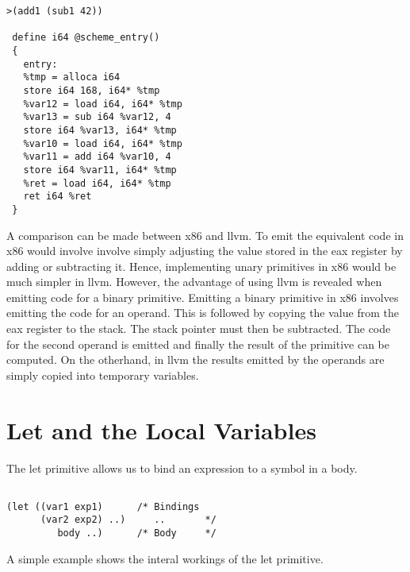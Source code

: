 \documentclass{article}
\begin{document}
\begin{verbatim}
>(add1 (sub1 42))

 define i64 @scheme_entry()
 {
   entry: 
   %tmp = alloca i64
   store i64 168, i64* %tmp
   %var12 = load i64, i64* %tmp
   %var13 = sub i64 %var12, 4
   store i64 %var13, i64* %tmp
   %var10 = load i64, i64* %tmp
   %var11 = add i64 %var10, 4
   store i64 %var11, i64* %tmp
   %ret = load i64, i64* %tmp
   ret i64 %ret
 }
\end{verbatim}


A comparison can be made between x86 and llvm. To emit the equivalent code in x86 would involve involve simply adjusting the value stored in the eax register by adding or subtracting it. Hence, implementing unary primitives in x86 would be much simpler in llvm. However, the advantage of using llvm is revealed when emitting code for a binary primitive. Emitting a binary primitive in x86 involves emitting the code for an operand. This is followed by copying the value from the eax register to the stack. The stack pointer must then be subtracted. The code for the second operand is emitted and finally the result of the primitive can be computed. On the otherhand, in llvm the results emitted by the operands are simply copied into temporary variables.


\section{Let and the Local Variables}

The let primitive allows us to bind an expression to a symbol in a body. 

\begin{verbatim}

(let ((var1 exp1)      /* Bindings
      (var2 exp2) ..)     ..       */
         body ..)      /* Body     */   

\end{verbatim}

A simple example shows the interal workings of the let primitive.
\end{document}
